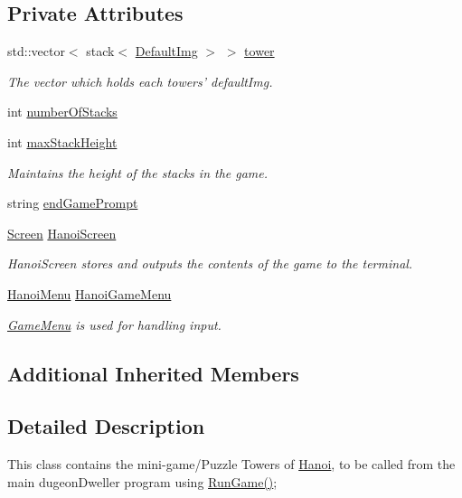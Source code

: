 \subsection*{Private Attributes}
\begin{DoxyCompactItemize}
\item 
std\-::vector$<$ stack$<$ \hyperlink{classDefaultImg}{Default\-Img} $>$ $>$ \hyperlink{classHanoi_afe67c656c8ce8c7006e8b7f23fbe9ae9}{tower}
\begin{DoxyCompactList}\small\item\em The vector which holds each towers' default\-Img. \end{DoxyCompactList}\item 
int \hyperlink{classHanoi_abcdaa5a4b56f9c3916bf49e054e1cf8c}{number\-Of\-Stacks}
\item 
int \hyperlink{classHanoi_a826f3bc786cb5c7b6499508d0b8bc9b4}{max\-Stack\-Height}
\begin{DoxyCompactList}\small\item\em Maintains the height of the stacks in the game. \end{DoxyCompactList}\item 
string \hyperlink{classHanoi_a43513810a88b1c43a61dc26838ce6446}{end\-Game\-Prompt}
\item 
\hyperlink{classScreen}{Screen} \hyperlink{classHanoi_a1b9bfd6a0428f772d78b66a5a3268c4c}{Hanoi\-Screen}
\begin{DoxyCompactList}\small\item\em Hanoi\-Screen stores and outputs the contents of the game to the terminal. \end{DoxyCompactList}\item 
\hyperlink{classHanoiMenu}{Hanoi\-Menu} \hyperlink{classHanoi_a7d73005d59c4f2134ffd564964ab3f49}{Hanoi\-Game\-Menu}
\begin{DoxyCompactList}\small\item\em \hyperlink{classGameMenu}{Game\-Menu} is used for handling input. \end{DoxyCompactList}\end{DoxyCompactItemize}
\subsection*{Additional Inherited Members}


\subsection{Detailed Description}
This class contains the mini-\/game/\-Puzzle Towers of \hyperlink{classHanoi}{Hanoi}, to be called from the main dugeon\-Dweller program using \hyperlink{classHanoi_a294a2a533b7f3305391aa880f7a0eb36}{Run\-Game()}; 

